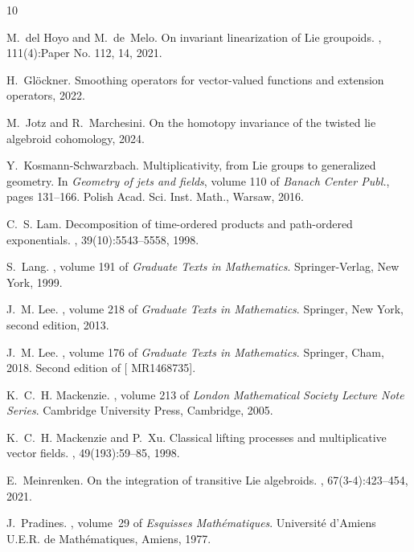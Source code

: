 \documentclass{amsart}
\theoremstyle{plain}
\begin{document}
\def\cprime{$'$} \def\polhk#1{\setbox0=\hbox{#1}{\ooalign{\hidewidth
  \lower1.5ex\hbox{`}\hidewidth\crcr\unhbox0}}} \def\cprime{$'$}
  \def\cprime{$'$}
\begin{thebibliography}{10}

M.~del Hoyo and M.~de~Melo.
\newblock On invariant linearization of {L}ie groupoids.
, 111(4):Paper No. 112, 14, 2021.

H.~Gl\"ockner.
\newblock Smoothing operators for vector-valued functions and extension
  operators, 2022.

M.~Jotz and R.~Marchesini.
\newblock On the homotopy invariance of the twisted lie algebroid cohomology,
  2024.

Y.~Kosmann-Schwarzbach.
\newblock Multiplicativity, from {L}ie groups to generalized geometry.
\newblock In {\em Geometry of jets and fields}, volume 110 of {\em Banach
  Center Publ.}, pages 131--166. Polish Acad. Sci. Inst. Math., Warsaw, 2016.

C.~S. Lam.
\newblock Decomposition of time-ordered products and path-ordered exponentials.
, 39(10):5543--5558, 1998.

S.~Lang.
, volume 191 of {\em
  Graduate Texts in Mathematics}.
\newblock Springer-Verlag, New York, 1999.

J.~M. Lee.
, volume 218 of {\em Graduate
  Texts in Mathematics}.
\newblock Springer, New York, second edition, 2013.

J.~M. Lee.
, volume 176 of {\em
  Graduate Texts in Mathematics}.
\newblock Springer, Cham, 2018.
\newblock Second edition of [ MR1468735].

K.~C.~H. Mackenzie.
,
  volume 213 of {\em London Mathematical Society Lecture Note Series}.
\newblock Cambridge University Press, Cambridge, 2005.

K.~C.~H. Mackenzie and P.~Xu.
\newblock Classical lifting processes and multiplicative vector fields.
, 49(193):59--85, 1998.

E.~Meinrenken.
\newblock On the integration of transitive {Lie} algebroids.
, 67(3-4):423--454, 2021.

J.~Pradines.
,
  volume~29 of {\em Esquisses Math\'ematiques}.
\newblock Universit\'e d'Amiens U.E.R. de Math\'ematiques, Amiens, 1977.

\end{thebibliography}
\end{document}
